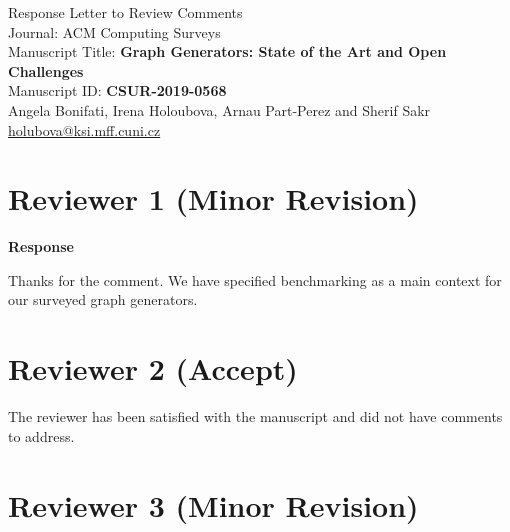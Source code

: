 \documentclass[a4paper,twoside,11pt]{reviewresponse}
\makeatletter
\newcommand{\myAuthors}{{Angela Bonifati, Irena Holoubova, Arnau Part-Perez and Sherif Sakr} }
\newcommand{\myEmail}{holubova@ksi.mff.cuni.cz}
\newcommand{\myTitle}{Response Letter to Review Comments}
\newcommand{\myJournal}{Journal: ACM Computing Surveys}
\newcommand{\manuTitle}{Manuscript Title: \textbf{Graph Generators: State of the Art and Open Challenges}}
\newcommand{\manuId}{Manuscript ID: \textbf{CSUR-2019-0568}}
\makeatother
\begin{document}
\thispagestyle{plain}

\begin{center}
 {\LARGE\myTitle} \vspace{0.5cm} \\
  {\large\myJournal} \vspace{0.5cm} \\
  \large\manuTitle \vspace{0.5cm} \\
  \manuId \vspace{0.5cm} \\
 \myAuthors \\
 \url{\myEmail} \vspace{1cm} \\
\end{center}


\begin{abstract}
The authors would like to thank the reviewers for their detailed, useful and constructive comments to improve the manuscript. Please find below our responses to the comments which have been included in the attached revised version for our manuscript.
\end{abstract}

\section{Reviewer 1 (Minor Revision)}


\textbf{Response}

Thanks for the comment. We have specified benchmarking as a main context for our surveyed graph generators.



\section{Reviewer 2 (Accept)}


The reviewer has been satisfied with the manuscript and did not have comments to address.

\section{Reviewer 3 (Minor Revision)}
\end{document}
